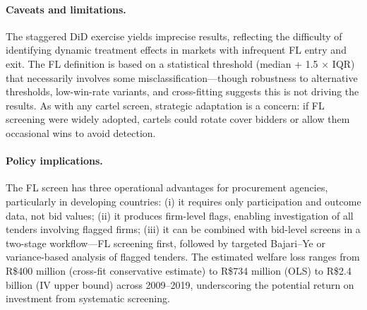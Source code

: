 \paragraph{Caveats and limitations.}
The staggered DiD exercise yields imprecise results, reflecting the
difficulty of identifying dynamic treatment effects in markets with
infrequent FL entry and exit. The FL definition is based on a
statistical threshold (median + 1.5 $\times$ IQR) that necessarily
involves some misclassification---though robustness to alternative
thresholds, low-win-rate variants, and cross-fitting suggests this is
not driving the results. As with any cartel screen, strategic adaptation
is a concern: if FL screening were widely adopted, cartels could rotate
cover bidders or allow them occasional wins to avoid detection.

\paragraph{Policy implications.}
The FL screen has three operational advantages for procurement agencies,
particularly in developing countries: (i) it requires only participation
and outcome data, not bid values; (ii) it produces firm-level flags,
enabling investigation of all tenders involving flagged firms; (iii) it
can be combined with bid-level screens in a two-stage workflow---FL
screening first, followed by targeted Bajari--Ye or variance-based
analysis of flagged tenders. The estimated welfare loss ranges from %
R\$400 million (cross-fit conservative estimate) to R\$734 million
(OLS) to R\$2.4 billion (IV upper bound) across 2009--2019,
underscoring the potential return on investment from systematic
screening.

